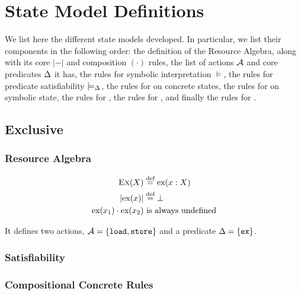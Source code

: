\chapter{State Model Definitions} \label{ap:definitions}

We list here the different state models developed. In particular, we list their components in the following order: the definition of the Resource Algebra, along with its core $|-|$ and composition $(\cdot)$ rules, the list of actions ${\cal{A}}$ and core predicates $\Delta$ it has, the rules for symbolic interpretation $\models$, the rules for predicate satisfiability $\models_{\Delta}$, the rules for \execac{} on concrete states, the rules for \execac{} on symbolic state, the rules for \consume, the rules for \produce, and finally the rules for \fix.

\section{Exclusive} \label{rules:ex}

\subsection{Resource Algebra}

\begin{align*}
 	\textsc{Ex}(X) &\stackrel{\textnormal{def}}=	\text{ex}(x: X)\\
 	|\text{ex}(x)| &\stackrel{\textnormal{def}}= \bot\\
 	\text{ex}(x_1) \cdot \text{ex}(x_2)&~\text{is always undefined}
\end{align*}

It defines two actions, ${\cal{A}}=\{\texttt{load}, \texttt{store}\}$ and a predicate $\Delta=\{\texttt{ex}\}$.

\subsection{Satisfiability}


\subsection{Compositional Concrete Rules}


